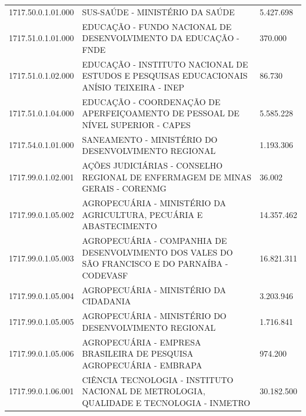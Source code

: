 \documentclass{article}
\begin{document}
\begin{longtable}[c]{m{2cm}|m{13cm}|m{2cm}}
\multicolumn{1}{C{2cm}|}{1717.50.0.1.01.000} & \multicolumn{1}{L{13cm}|}{SUS-SAÚDE - MINISTÉRIO DA SAÚDE} & \multicolumn{1}{R{2cm}}{5.427.698} \\
\multicolumn{1}{C{2cm}|}{1717.51.0.1.01.000} & \multicolumn{1}{L{13cm}|}{EDUCAÇÃO - FUNDO NACIONAL DE DESENVOLVIMENTO DA EDUCAÇÃO - FNDE} & \multicolumn{1}{R{2cm}}{370.000} \\
\multicolumn{1}{C{2cm}|}{1717.51.0.1.02.000} & \multicolumn{1}{L{13cm}|}{EDUCAÇÃO - INSTITUTO NACIONAL DE ESTUDOS E PESQUISAS EDUCACIONAIS ANÍSIO TEIXEIRA - INEP} & \multicolumn{1}{R{2cm}}{86.730} \\
\multicolumn{1}{C{2cm}|}{1717.51.0.1.04.000} & \multicolumn{1}{L{13cm}|}{EDUCAÇÃO - COORDENAÇÃO DE APERFEIÇOAMENTO DE PESSOAL DE NÍVEL SUPERIOR - CAPES} & \multicolumn{1}{R{2cm}}{5.585.228} \\
\multicolumn{1}{C{2cm}|}{1717.54.0.1.01.000} & \multicolumn{1}{L{13cm}|}{SANEAMENTO - MINISTÉRIO DO DESENVOLVIMENTO REGIONAL} & \multicolumn{1}{R{2cm}}{1.193.306} \\
\multicolumn{1}{C{2cm}|}{1717.99.0.1.02.001} & \multicolumn{1}{L{13cm}|}{AÇÕES JUDICIÁRIAS - CONSELHO REGIONAL DE ENFERMAGEM DE MINAS GERAIS - CORENMG} & \multicolumn{1}{R{2cm}}{36.002} \\
\multicolumn{1}{C{2cm}|}{1717.99.0.1.05.002} & \multicolumn{1}{L{13cm}|}{AGROPECUÁRIA - MINISTÉRIO DA AGRICULTURA, PECUÁRIA E ABASTECIMENTO} & \multicolumn{1}{R{2cm}}{14.357.462} \\
\multicolumn{1}{C{2cm}|}{1717.99.0.1.05.003} & \multicolumn{1}{L{13cm}|}{AGROPECUÁRIA - COMPANHIA DE DESENVOLVIMENTO DOS VALES DO SÃO FRANCISCO E DO PARNAÍBA - CODEVASF} & \multicolumn{1}{R{2cm}}{16.821.311} \\
\multicolumn{1}{C{2cm}|}{1717.99.0.1.05.004} & \multicolumn{1}{L{13cm}|}{AGROPECUÁRIA - MINISTÉRIO DA CIDADANIA} & \multicolumn{1}{R{2cm}}{3.203.946} \\
\multicolumn{1}{C{2cm}|}{1717.99.0.1.05.005} & \multicolumn{1}{L{13cm}|}{AGROPECUÁRIA - MINISTÉRIO DO DESENVOLVIMENTO REGIONAL} & \multicolumn{1}{R{2cm}}{1.716.841} \\
\multicolumn{1}{C{2cm}|}{1717.99.0.1.05.006} & \multicolumn{1}{L{13cm}|}{AGROPECUÁRIA - EMPRESA BRASILEIRA DE PESQUISA AGROPECUÁRIA - EMBRAPA} & \multicolumn{1}{R{2cm}}{974.200} \\
\multicolumn{1}{C{2cm}|}{1717.99.0.1.06.001} & \multicolumn{1}{L{13cm}|}{CIÊNCIA TECNOLOGIA - INSTITUTO NACIONAL DE METROLOGIA, QUALIDADE E TECNOLOGIA - INMETRO} & \multicolumn{1}{R{2cm}}{30.182.500} \\

\end{longtable}
\end{document}

